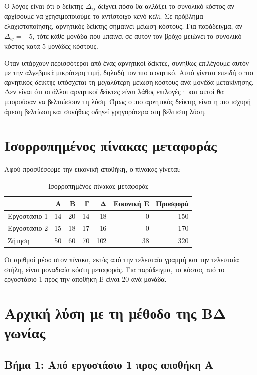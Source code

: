 \documentclass[12pt,a4paper]{article}
\begin{document}
Ο λόγος είναι ότι ο δείκτης \(\Delta_{ij}\) δείχνει πόσο θα αλλάξει το συνολικό κόστος αν αρχίσουμε να χρησιμοποιούμε το αντίστοιχο κενό κελί. Σε πρόβλημα ελαχιστοποίησης, αρνητικός δείκτης σημαίνει μείωση κόστους. Για παράδειγμα, αν \(\Delta_{ij}=-5\), τότε κάθε μονάδα που μπαίνει σε αυτόν τον βρόχο μειώνει το συνολικό κόστος κατά 5 μονάδες κόστους.

Όταν υπάρχουν περισσότεροι από ένας αρνητικοί δείκτες, συνήθως επιλέγουμε αυτόν με την αλγεβρικά μικρότερη τιμή, δηλαδή τον πιο αρνητικό. Αυτό γίνεται επειδή ο πιο αρνητικός δείκτης υπόσχεται τη μεγαλύτερη μείωση κόστους ανά μονάδα μετακίνησης. Δεν είναι ότι οι άλλοι αρνητικοί δείκτες είναι λάθος επιλογές· και αυτοί θα μπορούσαν να βελτιώσουν τη λύση. Όμως ο πιο αρνητικός δείκτης είναι η πιο ισχυρή άμεση βελτίωση και συνήθως οδηγεί γρηγορότερα στη βέλτιστη λύση.

\section{Ισορροπημένος πίνακας μεταφοράς}

Αφού προσθέσουμε την εικονική αποθήκη, ο πίνακας γίνεται:

\begin{table}[H]
\centering
\caption{Ισορροπημένος πίνακας μεταφοράς}
\small
\begin{tabular}{lrrrrrr}
\toprule
 & \textbf{Α} & \textbf{Β} & \textbf{Γ} & \textbf{Δ} & \textbf{Εικονική Ε} & \textbf{Προσφορά} \\
\midrule
Εργοστάσιο 1 & 14 & 20 & 14 & 18 & 0 & 150 \\
Εργοστάσιο 2 & 15 & 18 & 17 & 16 & 0 & 170 \\
\midrule
Ζήτηση & 50 & 60 & 70 & 102 & 38 & 320 \\
\bottomrule
\end{tabular}
\end{table}

Οι αριθμοί μέσα στον πίνακα, εκτός από την τελευταία γραμμή και την τελευταία στήλη, είναι μοναδιαία κόστη μεταφοράς. Για παράδειγμα, το κόστος από το εργοστάσιο 1 προς την αποθήκη Β είναι 20 ανά μονάδα.

\section{Αρχική λύση με τη μέθοδο της ΒΔ γωνίας}

\subsection{Βήμα 1: Από εργοστάσιο 1 προς αποθήκη Α}
\end{document}
